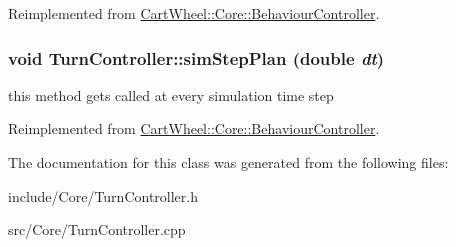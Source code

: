 Reimplemented from \hyperlink{classCartWheel_1_1Core_1_1BehaviourController_a9a96dacbf508de76c84fcf494b49c4c9}{CartWheel::Core::BehaviourController}.

\hypertarget{classCartWheel_1_1Core_1_1TurnController_af0157d75af6f328d1241d8c12954128e}{
\subsubsection[{simStepPlan}]{\setlength{\rightskip}{0pt plus 5cm}void TurnController::simStepPlan (double {\em dt})}}
\label{classCartWheel_1_1Core_1_1TurnController_af0157d75af6f328d1241d8c12954128e}
this method gets called at every simulation time step 

Reimplemented from \hyperlink{classCartWheel_1_1Core_1_1BehaviourController_a5a0b7293c3693f7a5860ae51bb65164e}{CartWheel::Core::BehaviourController}.



The documentation for this class was generated from the following files:\begin{DoxyCompactItemize}
\item 
include/Core/TurnController.h\item 
src/Core/TurnController.cpp\end{DoxyCompactItemize}
